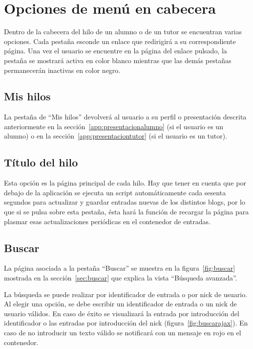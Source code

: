 \documentclass[a4paper, 12pt]{book}
\begin{document}
\section{Opciones de men\'u en cabecera}
Dentro de la cabecera del hilo de un alumno o de un tutor se encuentran varias opciones. Cada pesta\~na esconde un enlace que redirigir\'a a su 
correspondiente p\'agina. Una vez el usuario se encuentre en la p\'agina del enlace pulsado, la pesta\~na se mostrar\'a activa en color blanco mientras que 
las dem\'as pesta\~nas permanecer\'an inactivas en color negro.

\subsection{Mis hilos}
La pesta\~na de ``Mis hilos'' devolver\'a al usuario a su perfil o presentaci\'on descrita anteriormente en la secci\'on~\ref{app:presentacionalumno} (si el usuario
es un alumno) o en la secci\'on~\ref{app:presentaciontutor} (si el usuario es un tutor).

\subsection{T\'itulo del hilo}
Esta opci\'on es la p\'agina principal de cada hilo. Hay que tener en cuenta que por debajo de la aplicaci\'on se ejecuta un script autom\'aticamente cada 
sesenta segundos para actualizar y guardar entradas nuevas de los distintos blogs, por lo que si se pulsa sobre esta pesta\~na, \'esta har\'a la funci\'on 
de recargar la p\'agina para plasmar esas actualizaciones peri\'odicas en el contenedor de entradas.

\subsection{Buscar}
La p\'agina asociada a la pesta\~na ``Buscar'' se muestra en la figura~\ref{fig:buscar} mostrada en la secci\'on~\ref{sec:buscar} que explica la 
vista ``B\'usqueda avanzada''.

La b\'usqueda se puede realizar por identificador de entrada o por nick de usuario. Al elegir una opci\'on, se debe escribir un identificador de entrada o 
un nick de usuario v\'alidos. En caso de \'exito se visualizar\'a la entrada por introducci\'on del identificador o las entradas por introducci\'on del nick
(figura~\ref{fig:buscarajax}). En caso de no introducir un texto v\'alido se notificar\'a con un mensaje en rojo en el contenedor.
\end{document}

